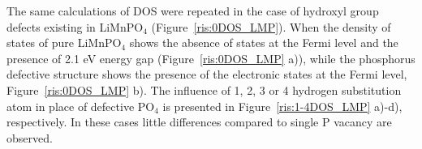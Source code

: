 The same calculations of DOS were repeated in the case of hydroxyl group defects existing in LiMnPO$_4$ (Figure~\ref{ris:0DOS_LMP}). When the density of states of pure LiMnPO$_4$ shows the absence of states at the Fermi level and the presence of 2.1 eV energy gap (Figure~\ref{ris:0DOS_LMP} a)), while the phosphorus defective structure shows the presence of the electronic states at the Fermi level, Figure~\ref{ris:0DOS_LMP} b). 
The influence of 1, 2, 3 or 4 hydrogen substitution atom in place of defective PO$_4$ is presented in Figure~\ref{ris:1-4DOS_LMP} a)-d), respectively. In these cases little differences compared to single P vacancy are observed.

\begin{figure}[h]
\begin{minipage}[h]{0.49\linewidth}
\end{minipage}
\hfill
\begin{minipage}[ht]{0.49\linewidth}

\end{minipage}
\end{figure}
